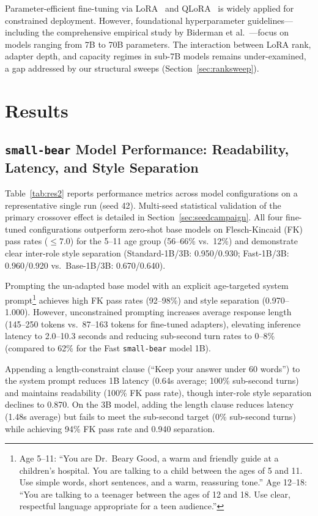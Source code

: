 \documentclass[pdflatex,sn-mathphys-num]{sn-jnl-official}%
\begin{document}
Parameter-efficient fine-tuning via LoRA~\cite{hu2022lora} and QLoRA~\cite{dettmers2023qlora} is widely applied for constrained deployment. However, foundational hyperparameter guidelines---including the comprehensive empirical study by Biderman et al.~\cite{biderman2024lora}---focus on models ranging from 7B to 70B parameters. The interaction between LoRA rank, adapter depth, and capacity regimes in sub-7B models remains under-examined, a gap addressed by our structural sweeps (Section~\ref{sec:ranksweep}).

\section{Results}\label{sec2}

\subsection{\texttt{small-bear} Model Performance: Readability, Latency, and Style Separation}\label{sec:responsemodel}

Table~\ref{tab:res2} reports performance metrics across model configurations on a representative single run (seed 42). Multi-seed statistical validation of the primary crossover effect is detailed in Section~\ref{sec:seedcampaign}. All four fine-tuned configurations outperform zero-shot base models on Flesch-Kincaid (FK) pass rates ($\leq 7.0$) for the 5--11 age group (56--66\% vs.\ 12\%) and demonstrate clear inter-role style separation (Standard-1B/3B: 0.950/0.930; Fast-1B/3B: 0.960/0.920 vs.\ Base-1B/3B: 0.670/0.640).

Prompting the un-adapted base model with an explicit age-targeted system prompt\footnote{Age 5--11: ``You are Dr.\ Beary Good, a warm and friendly guide at a children's hospital. You are talking to a child between the ages of 5 and 11. Use simple words, short sentences, and a warm, reassuring tone.'' Age 12--18: ``You are talking to a teenager between the ages of 12 and 18. Use clear, respectful language appropriate for a teen audience.''} achieves high FK pass rates (92--98\%) and style separation (0.970--1.000). However, unconstrained prompting increases average response length (145--250 tokens vs.\ 87--163 tokens for fine-tuned adapters), elevating inference latency to 2.0--10.3 seconds and reducing sub-second turn rates to 0--8\% (compared to 62\% for the Fast \texttt{small-bear} model 1B).

Appending a length-constraint clause (``Keep your answer under 60 words'') to the system prompt reduces 1B latency (0.64s average; 100\% sub-second turns) and maintains readability (100\% FK pass rate), though inter-role style separation declines to 0.870. On the 3B model, adding the length clause reduces latency (1.48s average) but fails to meet the sub-second target (0\% sub-second turns) while achieving 94\% FK pass rate and 0.940 separation.
\end{document}
